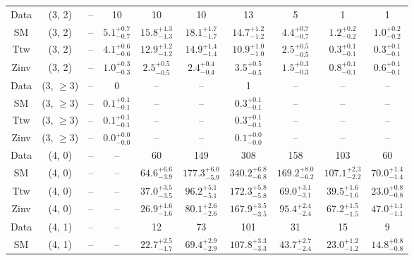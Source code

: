 \begin{table}[h!]
{\begin{tabular}{cccccccccc}
	Data & (3, 2) & -- & 10 & 10 & 10 & 13 & 5 & 1 & 1 \\[0.5ex] 
	SM & (3, 2) & -- & $5.1^{+ 0.7 }_{- 0.7 }$ & $15.8^{+ 1.3 }_{- 1.3 }$ & $18.1^{+ 1.7 }_{- 1.7 }$ & $14.7^{+ 1.2 }_{- 1.2 }$ & $4.4^{+ 0.7 }_{- 0.7 }$ & $1.2^{+ 0.2 }_{- 0.2 }$ & $1.0^{+ 0.2 }_{- 0.2 }$ \\[0.5ex] 
	Ttw & (3, 2) & -- & $4.1^{+ 0.6 }_{- 0.6 }$ & $12.9^{+ 1.2 }_{- 1.2 }$ & $14.9^{+ 1.4 }_{- 1.4 }$ & $10.9^{+ 1.0 }_{- 1.0 }$ & $2.5^{+ 0.5 }_{- 0.5 }$ & $0.3^{+ 0.1 }_{- 0.1 }$ & $0.3^{+ 0.1 }_{- 0.1 }$ \\[0.5ex] 
	Zinv & (3, 2) & -- & $1.0^{+ 0.3 }_{- 0.3 }$ & $2.5^{+ 0.5 }_{- 0.5 }$ & $2.4^{+ 0.4 }_{- 0.4 }$ & $3.5^{+ 0.5 }_{- 0.5 }$ & $1.5^{+ 0.3 }_{- 0.3 }$ & $0.8^{+ 0.1 }_{- 0.1 }$ & $0.6^{+ 0.1 }_{- 0.1 }$ \\[0.5ex] 
	Data & (3, $\ge3$) & -- & 0 & -- & -- & 1 & -- & -- & -- \\[0.5ex] 
	SM & (3, $\ge3$) & -- & $0.1^{+ 0.1 }_{- 0.1 }$ & -- & -- & $0.3^{+ 0.1 }_{- 0.1 }$ & -- & -- & -- \\[0.5ex] 
	Ttw & (3, $\ge3$) & -- & $0.1^{+ 0.1 }_{- 0.1 }$ & -- & -- & $0.3^{+ 0.1 }_{- 0.1 }$ & -- & -- & -- \\[0.5ex] 
	Zinv & (3, $\ge3$) & -- & $0.0^{+ 0.0 }_{- 0.0 }$ & -- & -- & $0.1^{+ 0.0 }_{- 0.0 }$ & -- & -- & -- \\[0.5ex] 
	Data & (4, 0) & -- & -- & 60 & 149 & 308 & 158 & 103 & 60 \\[0.5ex] 
	SM & (4, 0) & -- & -- & $64.6^{+ 6.6 }_{- 3.9 }$ & $177.3^{+ 6.0 }_{- 5.9 }$ & $340.2^{+ 6.8 }_{- 6.8 }$ & $169.2^{+ 8.0 }_{- 6.2 }$ & $107.1^{+ 2.3 }_{- 2.2 }$ & $70.0^{+ 1.4 }_{- 1.4 }$ \\[0.5ex] 
	Ttw & (4, 0) & -- & -- & $37.0^{+ 3.5 }_{- 3.5 }$ & $96.2^{+ 5.1 }_{- 5.1 }$ & $172.3^{+ 5.8 }_{- 5.8 }$ & $69.0^{+ 3.1 }_{- 3.1 }$ & $39.5^{+ 1.6 }_{- 1.6 }$ & $23.0^{+ 0.8 }_{- 0.8 }$ \\[0.5ex] 
	Zinv & (4, 0) & -- & -- & $26.9^{+ 1.6 }_{- 1.6 }$ & $80.1^{+ 2.6 }_{- 2.6 }$ & $167.9^{+ 3.5 }_{- 3.5 }$ & $95.4^{+ 2.4 }_{- 2.4 }$ & $67.2^{+ 1.5 }_{- 1.5 }$ & $47.0^{+ 1.1 }_{- 1.1 }$ \\[0.5ex] 
	Data & (4, 1) & -- & -- & 12 & 73 & 101 & 31 & 15 & 9 \\[0.5ex] 
	SM & (4, 1) & -- & -- & $22.7^{+ 2.5 }_{- 1.7 }$ & $69.4^{+ 2.9 }_{- 2.9 }$ & $107.8^{+ 3.3 }_{- 3.3 }$ & $43.7^{+ 2.7 }_{- 2.4 }$ & $23.0^{+ 1.2 }_{- 1.2 }$ & $14.8^{+ 0.8 }_{- 0.8 }$ \\[0.5ex] 

\end{tabular}}
\end{table}
